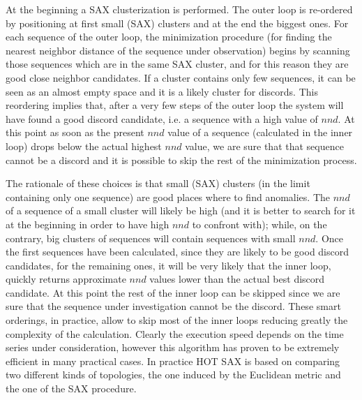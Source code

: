 \documentclass[a4paper,twoside]{article}
\begin{document}
At the beginning a SAX clusterization is performed.
The outer loop is re-ordered by positioning at first small (SAX) clusters and at the end the biggest ones. For each sequence of the outer loop, the minimization procedure (for finding the nearest neighbor distance of the sequence under observation) begins by scanning those sequences which are in the same SAX cluster, and for this reason they are good close neighbor candidates. If a cluster contains only few sequences, it can be seen as an almost empty space and it is a likely cluster for  discords.
This reordering implies that, after a very few steps of the outer loop the system will have found a good discord candidate, i.e. a sequence with a high value of $nnd$. At this point as soon as the present $nnd$ value of a sequence (calculated in the inner loop) drops below the actual highest $nnd$ value, we are sure that that sequence cannot be a discord and it is possible to skip the rest of the minimization process.
%


The rationale of these choices is that small (SAX) clusters (in the limit containing only one sequence) are good places where to find anomalies. The $nnd$ of a sequence of a small cluster will likely be high (and it is better to search for it at the beginning in order to have high $nnd$ to confront with); while, on the contrary, big clusters of sequences will contain sequences with small $nnd$. 
%
Once the first sequences have been calculated, since they are likely to be good discord candidates,  for the remaining ones, it will be very likely that the inner loop, quickly returns approximate $nnd$ values lower than the actual best discord candidate. At this point the rest of the inner loop can be skipped since we are sure that the sequence under investigation cannot be the discord.
%
These smart orderings, in practice, allow to skip most of the inner loops reducing greatly the complexity of the calculation. Clearly the execution speed depends on the time series under consideration, however this algorithm has proven to be extremely efficient in many practical cases.
In practice HOT SAX is based on comparing two different kinds of topologies, the one induced by the Euclidean metric and the one of the SAX procedure. 


%
\end{document}
